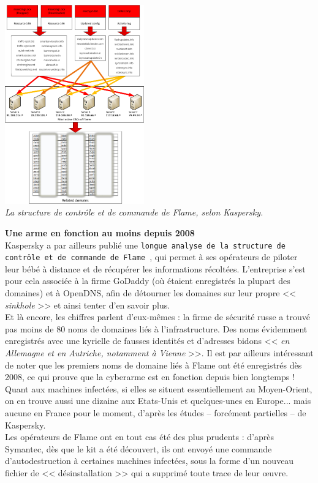 \documentclass[11pt,twoside,a4paper]{article}
\begin{document}
\begin{minipage}[ht]{6.25cm}	
	\includegraphics[width=6.00cm]{img/685335.png}
	~\\ \emph{La structure de contr{\^o}le et de commande de Flame, selon Kaspersky.}
\end{minipage} \hfill \begin{minipage}[ht]{12.50cm}
	\small
	\textbf{\large Une arme en fonction au moins depuis 2008}~\\
	
	Kaspersky a par ailleurs publi{\'e} une \texttt{longue analyse de la structure de contr{\^o}le et de commande de Flame~\footnotemark }, qui permet {\`a} ses op{\'e}rateurs de piloter leur b{\'e}b{\'e} {\`a} distance et de r{\'e}cup{\'e}rer les informations r{\'e}colt{\'e}es. L'entreprise s'est pour cela associ{\'e}e {\`a} la firme GoDaddy (o{\`u} {\'e}taient enregistr{\'e}s la plupart des domaines) et {\`a} OpenDNS, afin de d{\'e}tourner les domaines sur leur propre << \emph{sinkhole} >> et ainsi tenter d'en savoir plus.~\\
	
	Et l{\`a} encore, les chiffres parlent d'eux-m{\^e}mes : la firme de s{\'e}curit{\'e} russe a trouv{\'e} pas moins de 80 noms de domaines li{\'e}s {\`a} l'infrastructure. Des noms {\'e}videmment enregistr{\'e}s avec une kyrielle de fausses identit{\'e}s et d'adresses bidons << \emph{en Allemagne et en Autriche, notamment {\`a} Vienne} >>. Il est par ailleurs int{\'e}ressant de noter que les premiers noms de domaine li{\'e}s {\`a} Flame ont {\'e}t{\'e} enregistr{\'e}s d{\`e}s 2008, ce qui prouve que la cyberarme est en fonction depuis bien longtemps ! Quant aux machines infect{\'e}es, si elles se situent essentiellement au Moyen-Orient, on en trouve aussi une dizaine aux Etats-Unis et quelques-unes en Europe... mais aucune en France pour le moment, d'apr{\`e}s les {\'e}tudes -- forc{\'e}ment partielles -- de Kaspersky.~\\
	
	Les op{\'e}rateurs de Flame ont en tout cas {\'e}t{\'e} des plus prudents : d'apr{\`e}s Symantec, d{\`e}s que le kit a {\'e}t{\'e} d{\'e}couvert, ils ont envoy{\'e} une commande d'autodestruction {\`a} certaines machines infect{\'e}es, sous la forme d'un nouveau fichier de << d{\'e}sinstallation >> qui a supprim{\'e} toute trace de leur \oe uvre.~\\
\end{minipage}
\end{document}
